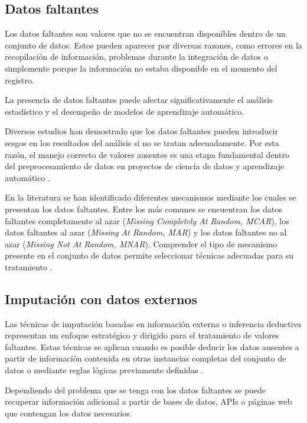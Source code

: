 \documentclass[12pt]{article}
\begin{document}
\subsection{Datos faltantes}

Los datos faltantes son valores que no se encuentran disponibles dentro de un conjunto de datos. 
Estos pueden aparecer por diversas razones, como errores en la recopilación de información, 
problemas durante la integración de datos o simplemente porque la información no estaba 
disponible en el momento del registro.

La presencia de datos faltantes puede afectar significativamente el análisis estadístico y el desempeño de modelos de aprendizaje automático.


Diversos estudios han demostrado que los datos faltantes pueden introducir sesgos en los resultados 
del análisis si no se tratan adecuadamente. Por esta razón, el manejo correcto de valores ausentes 
es una etapa fundamental dentro del preprocesamiento de datos en proyectos de ciencia de datos 
y aprendizaje automático \cite{little2019missing}.

En la literatura se han identificado diferentes mecanismos mediante los cuales se presentan los 
datos faltantes. Entre los más comunes se encuentran los datos faltantes completamente al azar 
(\textit{Missing Completely At Random, MCAR}), los datos faltantes al azar (\textit{Missing At Random, MAR}) 
y los datos faltantes no al azar (\textit{Missing Not At Random, MNAR}). Comprender el tipo de 
mecanismo presente en el conjunto de datos permite seleccionar técnicas adecuadas para su tratamiento 
\cite{little2019missing}.

\subsection{Imputación con datos externos}

Las técnicas de imputación basadas en información externa o inferencia deductiva representan un enfoque
estratégico y dirigido para el tratamiento de valores faltantes. Estas técnicas se aplican cuando es posible deducir
los datos ausentes a partir de información contenida en otras instancias completas del conjunto de datos o mediante reglas lógicas
previamente definidas \cite{De0a100enIA}.

Dependiendo del problema que se tenga con los datos faltantes
se puede recuperar información adicional a partir de bases de datos, APIs 
o páginas web que contengan los datos necesarios.
\end{document}
